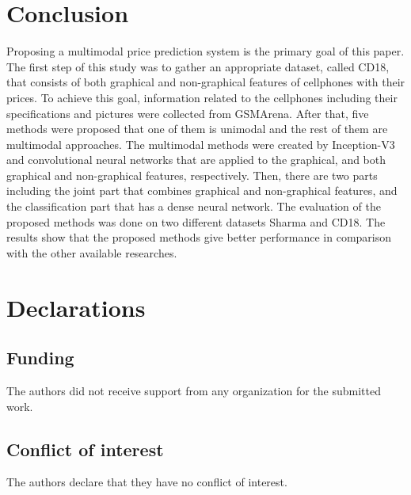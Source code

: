 \documentclass{svjour3}                     \smartqed  \usepackage{graphicx}
\begin{document}
\section{Conclusion} \label{Sec:conclusion}
Proposing a multimodal price prediction system is the primary goal of this paper. The first step of this study was to gather an appropriate dataset, called CD18, that consists of both graphical and non-graphical features of cellphones with their prices. To achieve this goal, information related to the cellphones including their specifications and pictures were collected from GSMArena. After that, five methods were proposed that one of them is unimodal and the rest of them are multimodal approaches. The multimodal methods were created by Inception-V3 and convolutional neural networks that are applied to the graphical, and both graphical and non-graphical features, respectively. Then, there are two parts including the joint part that combines  graphical and non-graphical features, and the classification part that has a dense neural network. The evaluation of the proposed methods was done on two different datasets Sharma and CD18. The results show that the proposed methods give better performance in comparison with the other available researches.







\section*{Declarations}

\subsection*{Funding}
The authors did not receive support from any organization for the submitted work.

\subsection*{Conflict of interest}
The authors declare that they have no conflict of interest.







   
\end{document}
